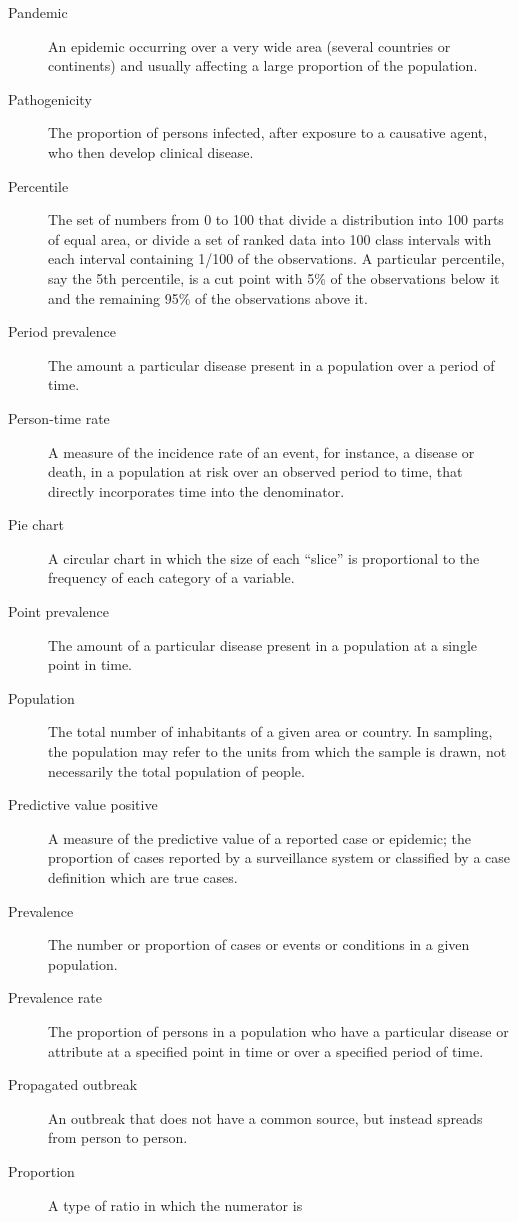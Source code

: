 \documentclass[11pt]{article}
\begin{document}
\begin{description}
\item[Pandemic] An epidemic occurring over a very wide area
(several countries or continents) and usually affecting a large
proportion of the population.
\item[Pathogenicity] The proportion of persons infected, after
exposure to a causative agent, who then develop clinical disease.
\item[Percentile] The set of numbers from 0 to 100 that divide a
distribution into 100 parts of equal area, or divide a set of
ranked data into 100 class intervals with each interval
containing 1/100 of the observations. A particular percentile,
say the 5th percentile, is a cut point with 5\% of the
observations below it and the remaining 95\% of the observations
above it.
\item[Period prevalence] The amount a particular disease present
in a population over a period of time.
\item[Person-time rate] A measure of the incidence rate of an
event, for instance, a disease or death, in a population at risk
over an observed period to time, that directly incorporates time
into the denominator.
\item[Pie chart] A circular chart in which the size of each
``slice'' is proportional to the frequency of each category of a
variable.
\item[Point prevalence] The amount of a particular disease
present in a population at a single point in time.
\item[Population] The total number of inhabitants of a given area
or country. In sampling, the population may refer to the units
from which the sample is drawn, not necessarily the total
population of people.
\item[Predictive value positive] A measure of the predictive
value of a reported case or epidemic; the proportion of cases
reported by a surveillance system or classified by a case
definition which are true cases.
\item[Prevalence] The number or proportion of cases or events or
conditions in a given population.
\item[Prevalence rate] The proportion of persons in a population
who have a particular disease or attribute at a specified point
in time or over a specified period of time.
\item[Propagated outbreak] An outbreak that does not have a
common source, but instead spreads from person to person.
\item[Proportion] A type of ratio in which the numerator is

\end{description}
\end{document}
